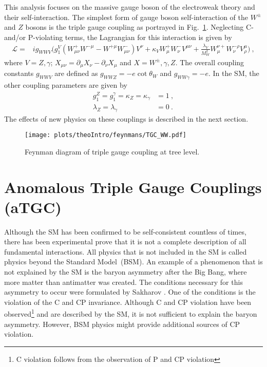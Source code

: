 \noindent This analysis focuses on the massive gauge boson of the electroweak theory and their self-interaction. The simplest form of gauge boson self-interaction of the $W^\pm$ and $Z$ bosons is the triple gauge coupling as portrayed in Fig.~\ref{fig:theo:tgc}. Neglecting C- and/or P-violating terms, the Lagrangian for this interaction is given by \cite{EFT}
\begin{align}
\mathcal{L} =& ig_{WWV}\Big( g_1^V(W_{\mu\nu}^+W^{-\mu} - W^{+\mu}W_{\mu\nu}^-)V^{\nu} + \kappa_VW_\mu^+W_\nu^-V^{\mu\nu}  + \frac{\lambda_V}{M_W^2}W_\mu^{\nu+}W_\nu^{-\rho}V_\rho^\mu  \Big) ~, \label{eq:theo:EWKlag}
\end{align}
where $V=Z,\gamma$; $X_{\mu\nu}=\partial_\mu X_\nu -\partial_\nu X_\mu$ and $X=W^\pm,\gamma ,Z$. The overall coupling constants $g_{WWV}$ are defined as $g_{WWZ} = -e \cot \theta_W$ and $g_{WW\gamma} =-e$. In the SM, the other coupling parameters are given by
\begin{align}
g_1^Z = g_1^\gamma = \kappa_Z = \kappa_\gamma &= 1 ~, \\
\lambda_Z = \lambda_\gamma &= 0 ~.
\end{align}
The effects of new physics on these couplings is described in the next section.
\begin{figure}
	\centering
	\texttt{[image: plots/theoIntro/feynmans/TGC\_WW.pdf]}
	\caption[Feynman diagram of triple gauge coupling at tree level]{Feynman diagram of triple gauge coupling at tree level.}
	\label{fig:theo:tgc}
\end{figure}

\section{Anomalous Triple Gauge Couplings (aTGC)}
\label{sec:aTGC}
Although the SM has been confirmed to be self-consistent countless of times, there has been experimental prove that it is not a complete description of all fundamental interactions. All physics that is not included in the SM is called physics beyond the Standard Model~(BSM). An example of a phenomenon that is not explained by the SM is the baryon asymmetry after the Big Bang, where more matter than antimatter was created. The conditions necessary for this asymmetry to occur were formulated by Sakharov \cite{sakharov}. One of the conditions is the violation of the C and CP invariance. Although C and CP violation have been observed\footnote{C violation follows from the observation of P \cite{wu} and CP violation}\cite{CP} and are described by the SM, it is not sufficient to explain the baryon asymmetry. However, BSM physics might provide additional sources of CP violation.\\

